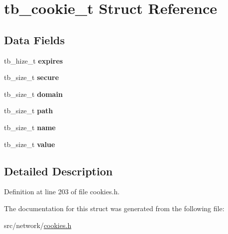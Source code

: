 \hypertarget{structtb__cookie__t}{\section{tb\-\_\-cookie\-\_\-t Struct Reference}
\label{structtb__cookie__t}
}
\subsection*{Data Fields}
\begin{DoxyCompactItemize}
\item 
\hypertarget{structtb__cookie__t_a2fc22287ca8894849882ad0da367d40b}{tb\-\_\-hize\-\_\-t {\bfseries expires}}\label{structtb__cookie__t_a2fc22287ca8894849882ad0da367d40b}

\item 
\hypertarget{structtb__cookie__t_ab07d578e0806f900555788b0fbb1b60e}{tb\-\_\-size\-\_\-t {\bfseries secure}}\label{structtb__cookie__t_ab07d578e0806f900555788b0fbb1b60e}

\item 
\hypertarget{structtb__cookie__t_a5a0b8df32df8cff83983c5ee211a0912}{tb\-\_\-size\-\_\-t {\bfseries domain}}\label{structtb__cookie__t_a5a0b8df32df8cff83983c5ee211a0912}

\item 
\hypertarget{structtb__cookie__t_acf737024f8cee2043a326be2d091fce4}{tb\-\_\-size\-\_\-t {\bfseries path}}\label{structtb__cookie__t_acf737024f8cee2043a326be2d091fce4}

\item 
\hypertarget{structtb__cookie__t_ae42c2d9604c8e987b72a994606d8ea28}{tb\-\_\-size\-\_\-t {\bfseries name}}\label{structtb__cookie__t_ae42c2d9604c8e987b72a994606d8ea28}

\item 
\hypertarget{structtb__cookie__t_a103b4f2cb32ac431828b526e840ebafb}{tb\-\_\-size\-\_\-t {\bfseries value}}\label{structtb__cookie__t_a103b4f2cb32ac431828b526e840ebafb}

\end{DoxyCompactItemize}


\subsection{Detailed Description}


Definition at line 203 of file cookies.\-h.



The documentation for this struct was generated from the following file\-:\begin{DoxyCompactItemize}
\item 
src/network/\hyperlink{cookies_8h}{cookies.\-h}\end{DoxyCompactItemize}
